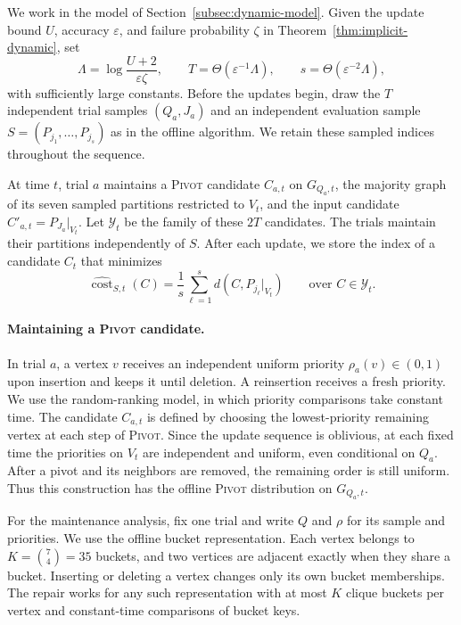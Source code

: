 \documentclass[11pt]{article}
\theoremstyle{definition}
\theoremstyle{remark}
\newcommand{\1}{\mathbf{1}}
\begin{document}
We work in the model of Section~\ref{subsec:dynamic-model}.
Given the update bound $U$, accuracy $\varepsilon$, and failure
probability $\zeta$ in Theorem~\ref{thm:implicit-dynamic}, set
\[
    \Lambda=\log\frac{U+2}{\varepsilon\zeta},
    \qquad
    T=\Theta(\varepsilon^{-1}\Lambda),
    \qquad
    s=\Theta(\varepsilon^{-2}\Lambda),
\]
with sufficiently large constants. Before the updates begin, draw the
$T$ independent trial samples $(Q_a,J_a)$ and an independent evaluation
sample $S=(P_{j_1},\ldots,P_{j_s})$ as in the offline algorithm.
We retain these sampled indices throughout the sequence.

At time $t$, trial $a$ maintains a \textsc{Pivot} candidate $C_{a,t}$
on $G_{Q_a,t}$, the majority graph of its seven sampled partitions
restricted to $V_t$, and the input candidate $C'_{a,t}=P_{J_a}|_{V_t}$.
Let $\mathcal Y_t$ be the family of these $2T$ candidates. The trials
maintain their partitions independently of $S$. After each update,
we store the index of a candidate $C_t$ that minimizes
\[
    \widehat{\operatorname{cost}}_{S,t}(C)
    =\frac{1}{s}\sum_{\ell=1}^{s}d(C,P_{j_\ell}|_{V_t})
    \qquad\text{over }C\in\mathcal Y_t.
\]

\paragraph{Maintaining a \textsc{Pivot} candidate.}
In trial $a$, a vertex $v$ receives an independent uniform priority
$\rho_a(v)\in(0,1)$ upon insertion and keeps it until deletion.
A reinsertion receives a fresh priority. We use the random-ranking
model, in which priority comparisons take constant time.
The candidate $C_{a,t}$ is defined by choosing the lowest-priority
remaining vertex at each step of \textsc{Pivot}. Since the update
sequence is oblivious, at each fixed time the priorities on $V_t$
are independent and uniform, even conditional on $Q_a$. After a
pivot and its neighbors are removed, the remaining order is still
uniform. Thus this construction has the offline \textsc{Pivot}
distribution on $G_{Q_a,t}$.

For the maintenance analysis, fix one trial and write $Q$ and $\rho$
for its sample and priorities. We use the offline bucket representation.
Each vertex belongs to $K=\binom{7}{4}=35$ buckets, and two vertices are
adjacent exactly when they share a bucket. Inserting or deleting a vertex
changes only its own bucket memberships. The repair works for any such
representation with at most $K$ clique buckets per vertex and
constant-time comparisons of bucket keys.
\end{document}
